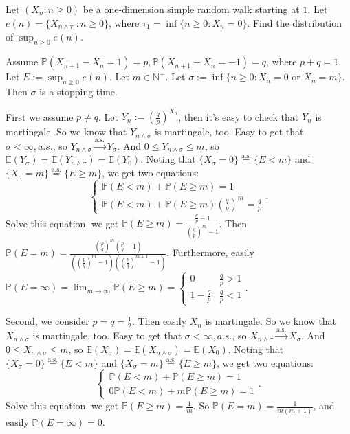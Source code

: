 \documentclass[../main]{subfiles}
\begin{document}
\begin{problem}\label{pro:2}
  Let \((X_{n}: n \geq 0)\) be a one-dimension simple random walk starting at \(1\).
  Let \(e(n)=\{X_{n \wedge \tau_1}: n \geq 0\}\), where \(\tau_1=\inf \{n \geq 0: X_{n}=0\}\).
  Find the distribution of \(\sup_{n \geq 0}e(n)\).
\end{problem}
\begin{solution}
  Assume \(\mathbb{P}(X_{n+1}-X_n=1)=p,\mathbb{P}(X_{n+1}-X_n=-1)=q\), where \(p+q=1\).
  Let \(E:=\sup_{n \geq 0}e(n)\).
  Let \(m \in \mathbb{N}^+\).
  Let \(\sigma:=\inf \{n \geq 0:X_n=0 \text{ or } X_n=m\}\). Then \(\sigma\) is a stopping time.

  First we assume \(p \neq  q\).
  Let \(Y_n:=\left(\frac{q}{p}\right)^{X_n}\), then it's easy to check that \(Y_n\) is martingale.
  So we know that \(Y_{n \wedge \sigma}\) is martingale, too.
  Easy to get that \(\sigma<\infty,a. s.\), so \(Y_{n \wedge \sigma} \overset{\text{a.s.}}{\to} Y_{\sigma}\).
  And \(0 \leq Y_{n \wedge \sigma} \leq m\), so \(\mathbb{E}(Y_{\sigma})=\mathbb{E}(Y_{n \wedge \sigma})=\mathbb{E}(Y_0)\).
  Noting that \(\{X_\sigma =0\}\overset{\text{a.s.}}{=}\{E<m\}\) and \(\{X_{\sigma}= m\}\overset{\text{a.s.}}{=}\{E \geq m\}\),
  we get two equations:
  \[
    \begin{cases}
      \mathbb{P}(E<m)+\mathbb{P}(E \geq m)=1 \\
      \mathbb{P}(E<m)+\mathbb{P}(E \geq m) \left(\frac{q}{p}\right)^m =\frac{q}{p}
    \end{cases}.
  \]
  Solve this equation, we get \(\mathbb{P}(E \geq m)=\frac{\frac{q}{p}-1}{(\frac{q}{p})^m-1}\).
  Then \(\mathbb{P}(E=m)=\frac{(\frac{p}{q})^m(\frac{p}{q}-1)}{((\frac{p}{q})^m-1)((\frac{p}{q})^{m+1}-1)}\).
  Furthermore, easily \(\mathbb{P}(E=\infty)=\lim_{m \to \infty}\mathbb{P}(E \geq m)=\begin{cases}
    0             & \frac{q}{p}>1 \\
    1-\frac{q}{p} & \frac{q}{p}<1
  \end{cases}\).

  Second, we consider \(p=q=\frac{1}{2}\). Then easily \(X_n\) is martingale.
  So we know that \(X_{n \wedge \sigma}\) is martingale, too.
  Easy to get that \(\sigma<\infty,a. s.\), so \(X_{n \wedge \sigma} \overset{\text{a.s.}}{\to} X_{\sigma}\).
  And \(0 \leq X_{n \wedge \sigma} \leq m\), so \(\mathbb{E}(X_{\sigma})=\mathbb{E}(X_{n \wedge \sigma})=\mathbb{E}(X_0)\).
  Noting that \(\{X_\sigma =0\}\overset{\text{a.s.}}{=}\{E<m\}\) and \(\{X_{\sigma}= m\}\overset{\text{a.s.}}{=}\{E \geq m\}\),
  we get two equations:
  \[
    \begin{cases}
      \mathbb{P}(E<m)+\mathbb{P}(E \geq m)=1 \\
      0\mathbb{P}(E<m)+m\mathbb{P}(E \geq m) =1
    \end{cases}.
  \]
  Solve this equation, we get \(\mathbb{P}(E \geq m)=\frac{1}{m}\).
  So \(\mathbb{P}(E=m)=\frac{1}{m(m+1)}\), and easily \(\mathbb{P}(E=\infty)=0\).
\end{solution}
\end{document}
